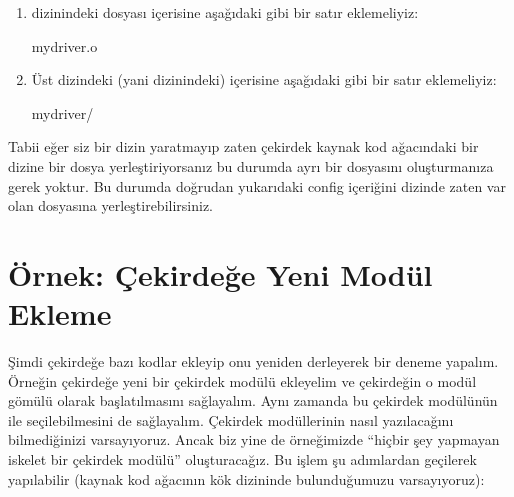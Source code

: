 \documentclass[a4paper,10pt,turkish]{sphinxmanual}
\begin{document}
\begin{enumerate}
\item {} 
\sphinxAtStartPar
{} dizinindeki  dosyası içerisine aşağıdaki gibi bir satır eklemeliyiz:

\begin{sphinxVerbatim}[commandchars=\\\{\}]
mydriver.o
\end{sphinxVerbatim}

\item {} 
\sphinxAtStartPar
Üst dizindeki (yani  dizinindeki)  içerisine aşağıdaki gibi bir satır
eklemeliyiz:

\begin{sphinxVerbatim}[commandchars=\\\{\}]
mydriver/
\end{sphinxVerbatim}

\end{enumerate}

\sphinxAtStartPar
Tabii eğer siz bir dizin yaratmayıp zaten çekirdek kaynak kod ağacındaki bir dizine bir dosya
yerleştiriyorsanız bu durumda ayrı bir  dosyasını oluşturmanıza gerek yoktur. Bu durumda
doğrudan yukarıdaki config içeriğini dizinde zaten var olan  dosyasına yerleştirebilirsiniz.


\section{Örnek: Çekirdeğe Yeni Modül Ekleme}
\label{\detokenize{kernelcompilation:ornek-cekirdege-yeni-modul-ekleme}}
\sphinxAtStartPar
Şimdi çekirdeğe bazı kodlar ekleyip onu yeniden derleyerek bir deneme yapalım. Örneğin çekirdeğe yeni
bir çekirdek modülü ekleyelim ve çekirdeğin o modül gömülü olarak başlatılmasını sağlayalım. Aynı
zamanda bu çekirdek modülünün  ile seçilebilmesini de sağlayalım. Çekirdek
modüllerinin nasıl yazılacağını bilmediğinizi varsayıyoruz. Ancak biz yine de örneğimizde “hiçbir şey
yapmayan iskelet bir çekirdek modülü” oluşturacağız. Bu işlem şu adımlardan geçilerek yapılabilir
(kaynak kod ağacının kök dizininde bulunduğumuzu varsayıyoruz):
\end{document}
